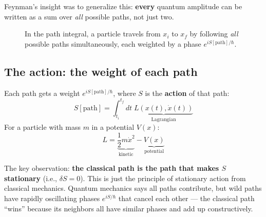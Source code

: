 \documentclass[12pt]{article}
\begin{document}
Feynman's insight was to generalize this: \textbf{every} quantum
amplitude can be written as a sum over \emph{all} possible paths,
not just two.

\begin{figure}[h]
\centering
{}
\caption{In the path integral, a particle travels from $x_i$ to $x_f$ by
following \emph{all} possible paths simultaneously, each weighted by a phase
$e^{iS[\text{path}]/\hbar}$.}
\end{figure}

\subsection{The action: the weight of each path}

Each path gets a weight $e^{iS[\text{path}]/\hbar}$, where
$S$ is the \textbf{action} of that path:
\begin{equation}
  S[\text{path}] = \int_{t_i}^{t_f} dt\;
  \underbrace{L(x(t), \dot{x}(t))}_{\text{Lagrangian}}
\end{equation}
For a particle with mass $m$ in a potential $V(x)$:
\begin{equation}
  L = \underbrace{\frac{1}{2}m\dot{x}^2}_{\text{kinetic}} -
  \underbrace{V(x)}_{\text{potential}}
\end{equation}

The key observation: \textbf{the classical path is the path that
makes $S$ stationary} (i.e., $\delta S = 0$). This is just the
principle of stationary action from classical mechanics. Quantum
mechanics says all paths contribute, but wild paths have rapidly
oscillating phases $e^{iS/\hbar}$ that cancel each other --- the
classical path ``wins'' because its neighbors all have similar phases
and add up constructively.
\end{document}
